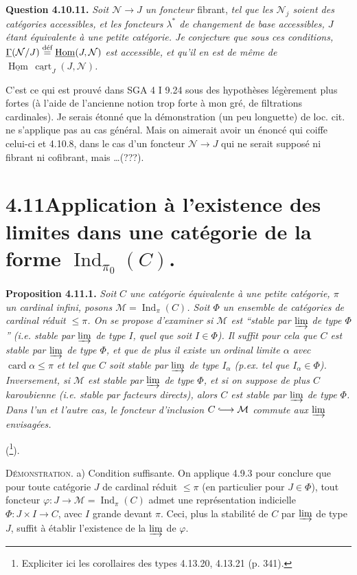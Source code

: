 \documentclass[11pt]{article}
\newcommand{\printedpage}[1]{\marginpar{\footnotesize p.~#1}}
\newcommand{\msp}[1]{\marginpar{\footnotesize [#1]}}
\newcommand{\defeq}{\overset{\text{\upshape déf}}{=}}
\newcommand{\Hom}{\underline{\operatorname{Hom}}}
\newcommand{\uGamma}{\underline{\Gamma}}
\newcommand{\Ind}{\operatorname{Ind}}
\newcommand{\into}{\lhook\joinrel\longrightarrow}
\begin{document}
\textbf{Question 4.10.11.} \textit{Soit $\mathcal{N} \longrightarrow J$ un foncteur} fibrant, \textit{tel que les $\mathcal{N}_j$ soient des catégories accessibles, et les foncteurs $\lambda^*$ de changement de base accessibles, $J$ étant équivalente à une petite catégorie. Je} \msp{page 267} \textit{conjecture que sous ces conditions, $\uGamma(\mathcal{N}/J) \defeq \Hom(J,\mathcal{N})$ est accessible, et qu'il en est de même de $\Hom\,\underline{\operatorname{cart}}_J(J,\mathcal{N})$.}

C'est ce qui est prouvé dans SGA 4 I 9.24 sous des hypothèses légèrement plus fortes (à l'aide de l'ancienne notion trop forte à mon gré, de filtrations cardinales). Je serais étonné que la démonstration (un peu longuette) de loc. cit. ne s'applique pas au cas général. Mais on aimerait avoir un énoncé qui coiffe celui-ci et 4.10.8, dans le cas d'un foncteur $\mathcal{N} \longrightarrow J$ qui ne serait supposé ni fibrant ni cofibrant, mais \ldots(???).

\section*{4.11\quad Application à l'existence des limites dans une catégorie de la forme $\Ind_{\pi_0}(C)$.}

\textbf{Proposition 4.11.1.} \textit{Soit} \msp{page 268} \textit{$C$ une catégorie équivalente à une petite catégorie, $\pi$ un cardinal infini, posons $\mathcal{M} = \Ind_\pi(C)$. Soit $\Phi$ un ensemble de catégories de cardinal réduit $\leqslant \pi$. On se propose d'examiner si $\mathcal{M}$ est “stable par $\varinjlim$ de type $\Phi$” (i.e. stable par $\varinjlim$ de type $I$, quel que soit $I \in \Phi$). Il suffit pour cela que $C$ est stable par $\varinjlim$ de type $\Phi$, et que de plus il existe un ordinal limite $\alpha$ avec $\operatorname{card}\alpha \leqslant \pi$ et tel que $C$ soit stable par $\varinjlim$ de type $I_\alpha$ (p.ex. tel que $I_\alpha \in \Phi$). Inversement, si $\mathcal{M}$ est stable par $\varinjlim$ de type $\Phi$, et si on suppose de plus $C$ karoubienne (i.e. stable par facteurs directs), alors $C$ est stable par $\varinjlim$ de type $\Phi$. Dans l'un et l'autre cas, le foncteur d'inclusion $C \into \mathcal{M}$ commute aux $\varinjlim$ envisagées.}

(\footnote{Expliciter ici les corollaires des types 4.13.20, 4.13.21 (p. 341).}).

\textsc{Démonstration}. a) Condition suffisante. On applique 4.9.3 pour conclure que
\printedpage{101}
\msp{page 269}
pour toute catégorie $J$ de cardinal réduit $\leqslant \pi$ (en particulier pour $J \in \Phi$), tout foncteur $\varphi : J \longrightarrow \mathcal{M} = \Ind_\pi(C)$ admet une représentation indicielle $\Phi : J \times I \longrightarrow C$, avec $I$ grande devant $\pi$. Ceci, plus la stabilité de $C$ par $\varinjlim$ de type $J$, suffit à établir l'existence de la $\varinjlim$ de $\varphi$.
\end{document}
